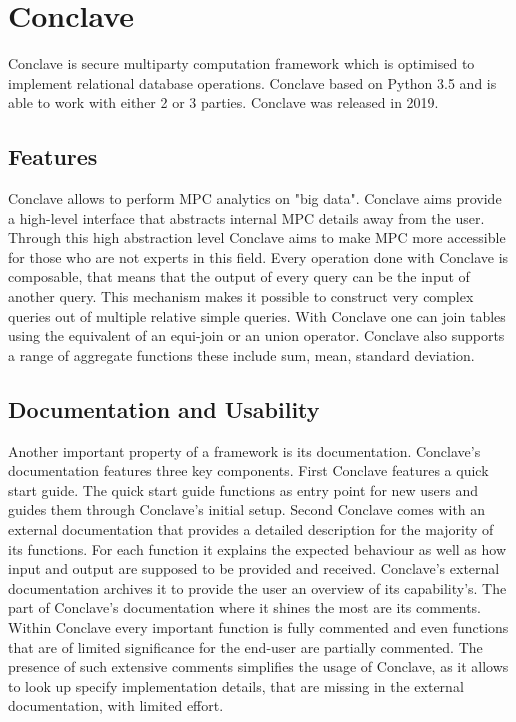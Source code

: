 \section{Conclave}
Conclave \cite{10.1145/3302424.3303982} is secure multiparty computation framework which is optimised to implement relational database operations. Conclave based on Python 3.5 and is able to work with either 2 or 3 parties. Conclave was released in 2019.
\subsection{Features}
 Conclave \cite{10.1145/3302424.3303982} allows to perform MPC analytics on "big data". Conclave aims provide a high-level interface that abstracts internal MPC details away from the user. Through this high abstraction level Conclave aims to make MPC more accessible for those who are not experts in this field.  Every operation done with Conclave is composable, that means that the output of every query can be the input of another query. This mechanism makes it possible to construct very complex queries out of multiple relative simple queries.  With Conclave one can join tables using the equivalent of an equi-join or an union operator. Conclave also supports a range of aggregate functions these include sum, mean, standard deviation. 
\subsection{Documentation and Usability}
Another important property of a framework is its documentation. Conclave's documentation features three key components. First Conclave features a quick start guide. The quick start guide functions as entry point for new users and guides them through Conclave's initial setup. 
Second Conclave comes with an external documentation that provides a detailed description for the majority of its functions. For each function it explains the expected behaviour as well as how input and output are supposed to be provided and received. Conclave's external documentation archives it to provide the user an overview of its capability's. 
The part of Conclave's documentation where it shines the most are its comments. Within Conclave every important function is fully commented and even functions that are of limited significance for the end-user are partially commented. The presence of such extensive comments simplifies the usage of Conclave, as it allows to look up specify implementation details, that are missing in the external documentation, with limited effort.    

